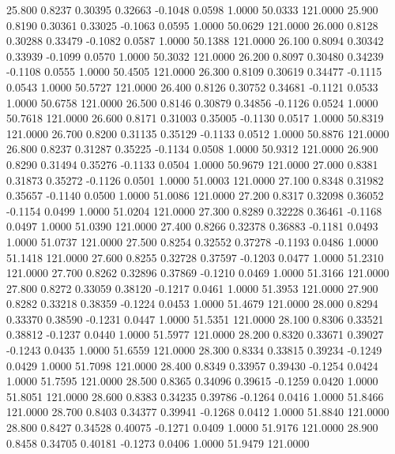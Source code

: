   25.800   0.8237   0.30395   0.32663  -0.1048   0.0598   1.0000  50.0333 121.0000
  25.900   0.8190   0.30361   0.33025  -0.1063   0.0595   1.0000  50.0629 121.0000
  26.000   0.8128   0.30288   0.33479  -0.1082   0.0587   1.0000  50.1388 121.0000
  26.100   0.8094   0.30342   0.33939  -0.1099   0.0570   1.0000  50.3032 121.0000
  26.200   0.8097   0.30480   0.34239  -0.1108   0.0555   1.0000  50.4505 121.0000
  26.300   0.8109   0.30619   0.34477  -0.1115   0.0543   1.0000  50.5727 121.0000
  26.400   0.8126   0.30752   0.34681  -0.1121   0.0533   1.0000  50.6758 121.0000
  26.500   0.8146   0.30879   0.34856  -0.1126   0.0524   1.0000  50.7618 121.0000
  26.600   0.8171   0.31003   0.35005  -0.1130   0.0517   1.0000  50.8319 121.0000
  26.700   0.8200   0.31135   0.35129  -0.1133   0.0512   1.0000  50.8876 121.0000
  26.800   0.8237   0.31287   0.35225  -0.1134   0.0508   1.0000  50.9312 121.0000
  26.900   0.8290   0.31494   0.35276  -0.1133   0.0504   1.0000  50.9679 121.0000
  27.000   0.8381   0.31873   0.35272  -0.1126   0.0501   1.0000  51.0003 121.0000
  27.100   0.8348   0.31982   0.35657  -0.1140   0.0500   1.0000  51.0086 121.0000
  27.200   0.8317   0.32098   0.36052  -0.1154   0.0499   1.0000  51.0204 121.0000
  27.300   0.8289   0.32228   0.36461  -0.1168   0.0497   1.0000  51.0390 121.0000
  27.400   0.8266   0.32378   0.36883  -0.1181   0.0493   1.0000  51.0737 121.0000
  27.500   0.8254   0.32552   0.37278  -0.1193   0.0486   1.0000  51.1418 121.0000
  27.600   0.8255   0.32728   0.37597  -0.1203   0.0477   1.0000  51.2310 121.0000
  27.700   0.8262   0.32896   0.37869  -0.1210   0.0469   1.0000  51.3166 121.0000
  27.800   0.8272   0.33059   0.38120  -0.1217   0.0461   1.0000  51.3953 121.0000
  27.900   0.8282   0.33218   0.38359  -0.1224   0.0453   1.0000  51.4679 121.0000
  28.000   0.8294   0.33370   0.38590  -0.1231   0.0447   1.0000  51.5351 121.0000
  28.100   0.8306   0.33521   0.38812  -0.1237   0.0440   1.0000  51.5977 121.0000
  28.200   0.8320   0.33671   0.39027  -0.1243   0.0435   1.0000  51.6559 121.0000
  28.300   0.8334   0.33815   0.39234  -0.1249   0.0429   1.0000  51.7098 121.0000
  28.400   0.8349   0.33957   0.39430  -0.1254   0.0424   1.0000  51.7595 121.0000
  28.500   0.8365   0.34096   0.39615  -0.1259   0.0420   1.0000  51.8051 121.0000
  28.600   0.8383   0.34235   0.39786  -0.1264   0.0416   1.0000  51.8466 121.0000
  28.700   0.8403   0.34377   0.39941  -0.1268   0.0412   1.0000  51.8840 121.0000
  28.800   0.8427   0.34528   0.40075  -0.1271   0.0409   1.0000  51.9176 121.0000
  28.900   0.8458   0.34705   0.40181  -0.1273   0.0406   1.0000  51.9479 121.0000
